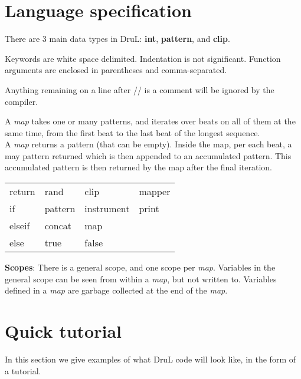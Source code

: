 \section{Language specification}
There are $3$ main data types in DruL: \textbf{int}, \textbf{pattern},
and \textbf{clip}.

Keywords are white space delimited. Indentation is not significant.
Function arguments are enclosed in parentheses and comma-separated.

Anything remaining on a line after // is a comment will be ignored by the compiler.

A \textit{map} takes one or many patterns, and iterates over beats on all
of them at the same time, from the first beat to the last beat of the longest
sequence.\\
A \textit{map} returns a pattern (that can be empty).  Inside the map, per each beat, a may pattern
returned which is then appended to an accumulated pattern.
This accumulated pattern is then returned by the map after the final iteration.

\begin{table}[htb]
\begin{center}
\begin{tabular}{llll}
  return & rand    & clip       & mapper \\
  if     & pattern & instrument & print  \\
  elseif & concat  & map        &        \\
  else   & true    & false      &
\end{tabular}
\label{tab:keywords}
\end{center}
\end{table}

\textbf{Scopes}: There is a general scope, and one scope per \textit{map}.
Variables in the general scope can be seen from within a \textit{map}, but not written to.
Variables defined in a \textit{map} are garbage collected at the end of the \textit{map}.

\pagebreak

\section{Quick tutorial}
In this section we give examples of what DruL code will look like, in the form
of a tutorial.

